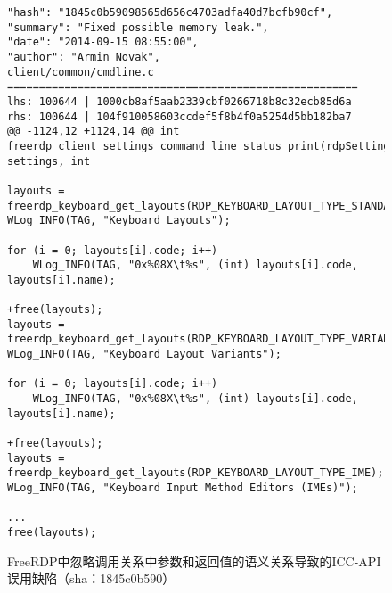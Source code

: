 \begin{figure}[t]
	\centering
\begin{lstlisting}
"hash": "1845c0b59098565d656c4703adfa40d7bcfb90cf",
"summary": "Fixed possible memory leak.",
"date": "2014-09-15 08:55:00",
"author": "Armin Novak",
client/common/cmdline.c
=======================================================
lhs: 100644 | 1000cb8af5aab2339cbf0266718b8c32ecb85d6a
rhs: 100644 | 104f910058603ccdef5f8b4f0a5254d5bb182ba7
@@ -1124,12 +1124,14 @@ int freerdp_client_settings_command_line_status_print(rdpSettings* settings, int

layouts = freerdp_keyboard_get_layouts(RDP_KEYBOARD_LAYOUT_TYPE_STANDARD);
WLog_INFO(TAG, "Keyboard Layouts");

for (i = 0; layouts[i].code; i++)
	WLog_INFO(TAG, "0x%08X\t%s", (int) layouts[i].code, layouts[i].name);
	
+free(layouts);
layouts = freerdp_keyboard_get_layouts(RDP_KEYBOARD_LAYOUT_TYPE_VARIANT);
WLog_INFO(TAG, "Keyboard Layout Variants");

for (i = 0; layouts[i].code; i++)
	WLog_INFO(TAG, "0x%08X\t%s", (int) layouts[i].code, layouts[i].name);

+free(layouts);
layouts = freerdp_keyboard_get_layouts(RDP_KEYBOARD_LAYOUT_TYPE_IME);
WLog_INFO(TAG, "Keyboard Input Method Editors (IMEs)");

...
free(layouts);
\end{lstlisting}
	\caption{
	FreeRDP中忽略调用关系中参数和返回值的语义关系导致的ICC-API误用缺陷（sha：1845c0b590）
	}
	\label{fig:2-3-icc-2}
\end{figure}